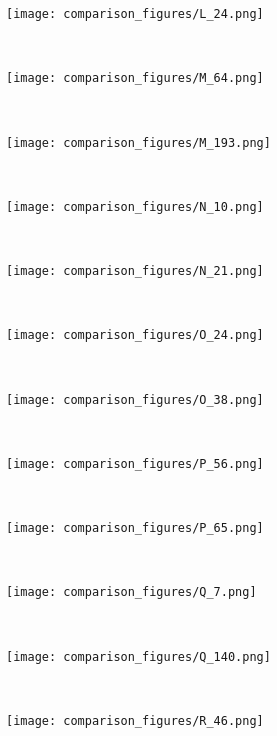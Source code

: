 \documentclass[conference]{IEEEtran}
\begin{document}
\begin{figure*}[!htbp]
\begin{subfigure}[b]{0.15\textwidth}
        \texttt{[image: comparison\_figures/L\_24.png]}
    \end{subfigure}
    ~
    \begin{subfigure}[b]{0.15\textwidth}
        \texttt{[image: comparison\_figures/M\_64.png]}
    \end{subfigure}
    ~
    \begin{subfigure}[b]{0.15\textwidth}
        \texttt{[image: comparison\_figures/M\_193.png]}
    \end{subfigure}
    ~
    \begin{subfigure}[b]{0.15\textwidth}
        \texttt{[image: comparison\_figures/N\_10.png]}
    \end{subfigure}
    ~
    \begin{subfigure}[b]{0.15\textwidth}
        \texttt{[image: comparison\_figures/N\_21.png]}
    \end{subfigure}
    ~
    \begin{subfigure}[b]{0.15\textwidth}
        \texttt{[image: comparison\_figures/O\_24.png]}
    \end{subfigure}
    ~
    \begin{subfigure}[b]{0.15\textwidth}
        \texttt{[image: comparison\_figures/O\_38.png]}
    \end{subfigure}
    ~
    \begin{subfigure}[b]{0.15\textwidth}
        \texttt{[image: comparison\_figures/P\_56.png]}
    \end{subfigure}
    ~
    \begin{subfigure}[b]{0.15\textwidth}
        \texttt{[image: comparison\_figures/P\_65.png]}
    \end{subfigure}
    ~
    \begin{subfigure}[b]{0.15\textwidth}
        \texttt{[image: comparison\_figures/Q\_7.png]}
    \end{subfigure}
    ~
    \begin{subfigure}[b]{0.15\textwidth}
        \texttt{[image: comparison\_figures/Q\_140.png]}
    \end{subfigure}
    ~
    \begin{subfigure}[b]{0.15\textwidth}
        \texttt{[image: comparison\_figures/R\_46.png]}
    \end{subfigure}
    ~
    \begin{subfigure}[b]{0.15\textwidth}

\end{subfigure}
\end{figure*}
\end{document}

